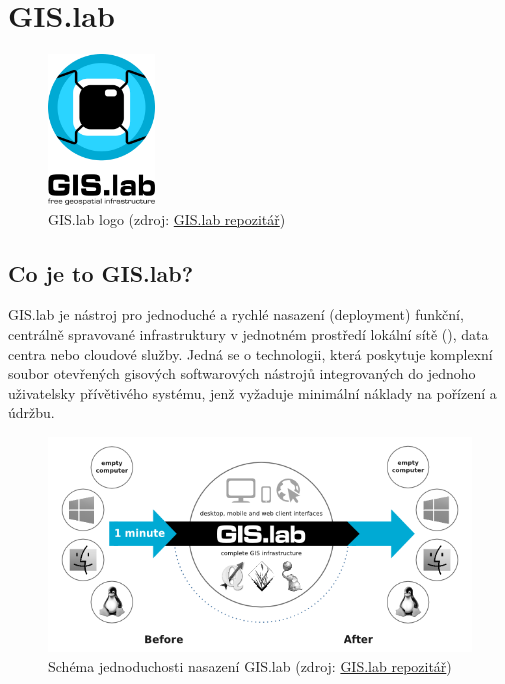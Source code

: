 \chapter{GIS.lab}
\label{2-teorie}

\begin{figure}[H] \centering
    \includegraphics[width=80pt]{./pictures/gislab-logo.png}
    \caption[GIS.lab logo]{GIS.lab logo (zdroj:
	\href{https://github.com/gislab-npo/gislab-doc/blob/master/img/logo.svg}{GIS.lab repozitář})}
	\label{fig:gislab-logo}
\end{figure}

\section{Co je to GIS.lab?}

GIS.lab je nástroj pro jednoduché a rychlé nasazení (deployment)
funkční, centrálně spravované  infrastruktury v jednotném
prostředí lokální sítě (), data centra nebo cloudové
služby. Jedná se o technologii, která poskytuje komplexní soubor
otevřených gisových softwarových nástrojů integrovaných do jednoho
uživatelsky přívětivého systému, jenž vyžaduje minimální náklady na
pořízení a údržbu.

\begin{figure}[H] \centering
    \includegraphics[width=400pt]{./pictures/gislab-schema.png}
    \caption[Schéma jednoduchosti nasazení GIS.lab]{Schéma jednoduchosti nasazení GIS.lab (zdroj:
	\href{https://github.com/gislab-npo/gislab-doc/blob/master/img/general/gislab-schema.png}{GIS.lab repozitář})}
	\label{fig:gislab-schema}
\end{figure}


